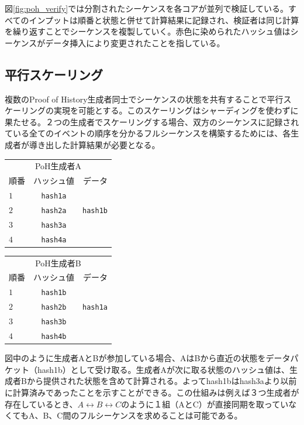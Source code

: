 \documentclass[12pt]{ltjsarticle}
\begin{document}
図\ref{fig:poh_verify}では分割されたシーケンスを各コアが並列で検証している。すべてのインプットは順番と状態と併せて計算結果に記録され、検証者は同じ計算を繰り返すことでシーケンスを複製していく。赤色に染められたハッシュ値はシーケンスがデータ挿入により変更されたことを指している。

\subsection{平行スケーリング}\label{poh:scale}
複数のProof of History生成者同士でシーケンスの状態を共有することで平行スケーリングの実現を可能とする。このスケーリングはシャーディングを使わずに果たせる。２つの生成者でスケーリングする場合、双方のシーケンスに記録されている全てのイベントの順序を分かるフルシーケンスを構築するためには、各生成者が導き出した計算結果が必要となる。

\begin{center}
  \begin{tabular}{|l c r|}

  \hline
    \multicolumn{3}{|c|}{PoH生成者A} \\
    順番  & ハッシュ値 & データ \\ \hline
    $1$ & \texttt{hash1a} & \\ 
    $2$ & \texttt{hash2a} & \texttt{hash1b} \\ 
    $3$ & \texttt{hash3a} & \\ 
    $4$ & \texttt{hash4a} & \\
    \hline
    \end{tabular}
  \begin{tabular}{| l  c  r |}
  \hline
    \multicolumn{3}{|c|}{PoH生成者B} \\
    順番  & ハッシュ値 & データ \\ \hline
    $1$ & \texttt{hash1b} & \\ 
    $2$ & \texttt{hash2b} & \texttt{hash1a} \\ 
    $3$ & \texttt{hash3b} & \\ 
    $4$ & \texttt{hash4b} & \\
    \hline
    \end{tabular}
\end{center}

図中のように生成者AとBが参加している場合、AはBから直近の状態をデータパケット（hash1b）として受け取る。生成者Aが次に取る状態のハッシュ値は、生成者Bから提供された状態を含めて計算される。よってhash1bはhash3aより以前に計算済みであったことを示すことができる。この仕組みは例えば３つ生成者が存在しているとき、\(A \leftrightarrow B \leftrightarrow C\)のように１組（AとC）が直接同期を取っていなくてもA、B、C間のフルシーケンスを求めることは可能である。
\end{document}
